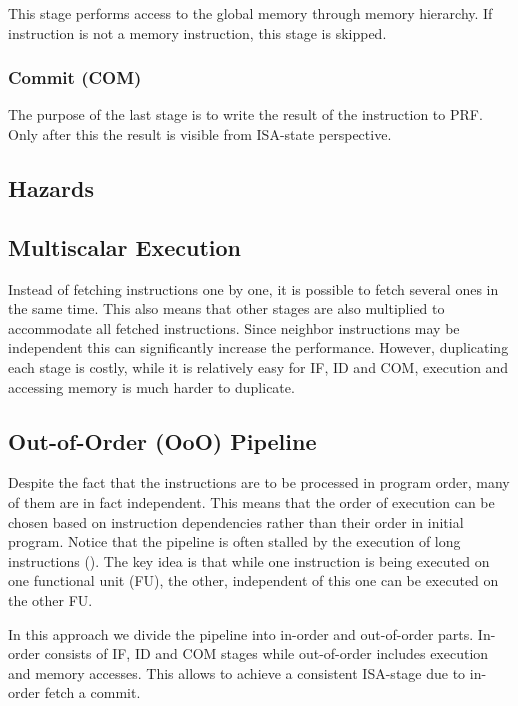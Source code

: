 This stage performs access to the global memory through memory hierarchy. If instruction is not a memory instruction, this stage is skipped.

\subsubsection{Commit (COM)}

The purpose of the last stage is to write the result of the instruction to PRF. Only after this the result is visible from ISA-state perspective.

\subsection{Hazards}

\TODO{}


\subsection{Multiscalar Execution}

Instead of fetching instructions one by one, it is possible to fetch several ones in the same time. This also means that other stages are also multiplied to accommodate all fetched instructions. Since neighbor instructions may be independent this can significantly increase the performance. However, duplicating each stage is costly, while it is relatively easy for IF, ID and COM, execution and accessing memory is much harder to duplicate.

\subsection{Out-of-Order (OoO) Pipeline}

Despite the fact that the instructions are to be processed in program order, many of them are in fact independent. This means that the order of execution can be chosen based on instruction dependencies rather than their order in initial program. Notice that the pipeline is often stalled by the execution of long instructions (). The key idea is that while one instruction is being executed on one functional unit (FU), the other, independent of this one can be executed on the other FU. 

In this approach we divide the pipeline into in-order and out-of-order parts. In-order consists of IF, ID and COM stages while out-of-order includes execution and memory accesses. This allows to achieve a consistent ISA-stage due to in-order fetch a commit. 

